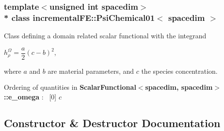 \subsubsection*{template$<$unsigned int spacedim$>$\\*
class incremental\+F\+E\+::\+Psi\+Chemical01$<$ spacedim $>$}

Class defining a domain related scalar functional with the integrand

$h^\Omega_\rho = \dfrac{a}{2} (c-b)^2$,

where $a$ and $b$ are material parameters, and $c$ the species concentration.

Ordering of quantities in {\bf Scalar\+Functional$<$spacedim, spacedim$>$\+::e\+\_\+omega} \+:~\newline
 \mbox{[}0\mbox{]} $c$ 

\subsection{Constructor \& Destructor Documentation}
